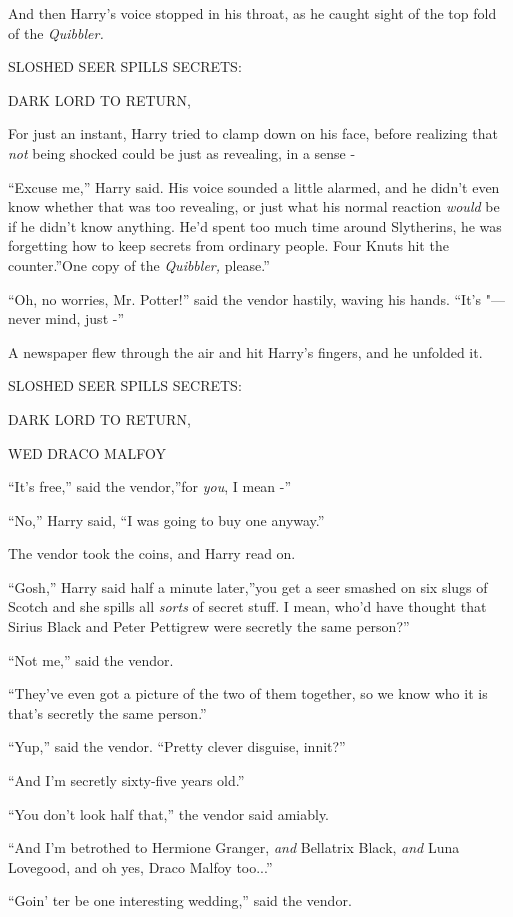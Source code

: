 And then Harry's voice stopped in his throat, as he caught sight of the
top fold of the \emph{Quibbler.}

SLOSHED SEER SPILLS SECRETS:

DARK LORD TO RETURN,

For just an instant, Harry tried to clamp down on his face, before
realizing that \emph{not} being shocked could be just as revealing, in a
sense -

``Excuse me,'' Harry said. His voice sounded a little alarmed, and he
didn't even know whether that was too revealing, or just what his normal
reaction \emph{would} be if he didn't know anything. He'd spent too much
time around Slytherins, he was forgetting how to keep secrets from
ordinary people. Four Knuts hit the counter.''One copy of the
\emph{Quibbler,} please.''

``Oh, no worries, Mr. Potter!'' said the vendor hastily, waving his
hands. ``It's "--- never mind, just -''

A newspaper flew through the air and hit Harry's fingers, and he
unfolded it.

SLOSHED SEER SPILLS SECRETS:

DARK LORD TO RETURN,

WED DRACO MALFOY

``It's free,'' said the vendor,''for \emph{you}, I mean -''

``No,'' Harry said, ``I was going to buy one anyway.''

The vendor took the coins, and Harry read on.

``Gosh,'' Harry said half a minute later,''you get a seer smashed on six
slugs of Scotch and she spills all \emph{sorts} of secret stuff. I mean,
who'd have thought that Sirius Black and Peter Pettigrew were secretly
the same person?''

``Not me,'' said the vendor.

``They've even got a picture of the two of them together, so we know who
it is that's secretly the same person.''

``Yup,'' said the vendor. ``Pretty clever disguise, innit?''

``And I'm secretly sixty-five years old.''

``You don't look half that,'' the vendor said amiably.

``And I'm betrothed to Hermione Granger, \emph{and} Bellatrix Black,
\emph{and} Luna Lovegood, and oh yes, Draco Malfoy too...''

``Goin' ter be one interesting wedding,'' said the vendor.

